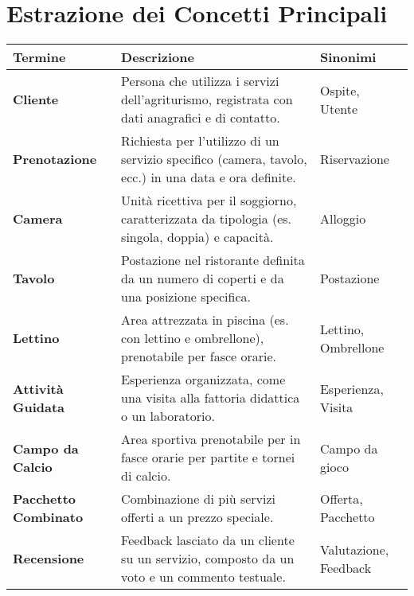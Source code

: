 \documentclass[a4paper,11pt]{report}
\begin{document}
\section{Estrazione dei Concetti Principali}
\renewcommand{\arraystretch}{1.5} 
\begin{center}
    \begin{tabularx}{\textwidth}{l >{\raggedright\arraybackslash}X l}
        \rowcolor{blue!25}
        \textbf{Termine } &                         \textbf{Descrizione} &                          \textbf{Sinonimi } \\
        \hline
        \textbf{Cliente} & Persona che utilizza i servizi dell'agriturismo, registrata con dati anagrafici e di contatto. & Ospite, Utente \\
        \hline
        \textbf{Prenotazione} & Richiesta per l'utilizzo di un servizio specifico (camera, tavolo, ecc.) in una data e ora definite. & Riservazione \\
        \hline
        \textbf{Camera} & Unità ricettiva per il soggiorno, caratterizzata da tipologia (es. singola, doppia) e capacità. & Alloggio \\
        \hline
        \textbf{Tavolo} & Postazione nel ristorante definita da un numero di coperti e da una posizione specifica. & Postazione \\
        \hline
        \textbf{Lettino} & Area attrezzata in piscina (es. con lettino e ombrellone), prenotabile per fasce orarie. & Lettino, Ombrellone \\
        \hline
        \textbf{Attività Guidata} & Esperienza organizzata, come una visita alla fattoria didattica o un laboratorio. & Esperienza, Visita \\
        \hline
        \textbf{Campo da Calcio} & Area sportiva prenotabile per in fasce orarie per partite e tornei di calcio. & Campo da gioco \\
        \hline
        \textbf{Pacchetto Combinato} & Combinazione di più servizi offerti a un prezzo speciale. & Offerta, Pacchetto \\
        \hline
        \textbf{Recensione} & Feedback lasciato da un cliente su un servizio, composto da un voto e un commento testuale. & Valutazione, Feedback \\
        \hline

\end{tabularx}
\end{center}
\end{document}
